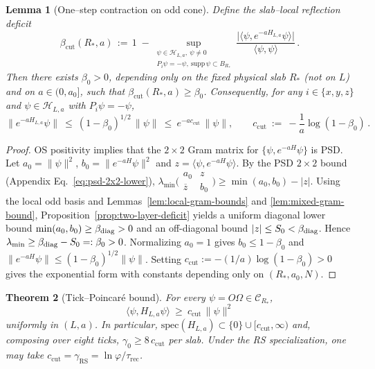 \documentclass[11pt]{amsart}
\theoremstyle{plain}
\newtheorem{theorem}{Theorem}[section]
\newtheorem{lemma}[theorem]{Lemma}
\theoremstyle{definition}
\theoremstyle{remark}
\begin{document}
\begin{lemma}[One--step contraction on odd cone]\label{lem:odd-contraction-tp}
Define the slab--local reflection deficit
\[
  \beta_{\mathrm{cut}}(R_*,a)
  \,:=\,
  1\;-
  \sup_{\substack{\psi\in\mathcal H_{L,a},\ \psi\ne 0\\ P_i\psi=-\psi,\ \mathrm{supp}\,\psi\subset B_{R_*}}}
  \frac{\big|\langle\psi, e^{-aH_{L,a}}\psi\rangle\big|}{\langle\psi,\psi\rangle}\,.
\]
Then there exists $\beta_0>0$, depending only on the fixed physical slab $R_*$ (not on $L$) and on $a\in(0,a_0]$, such that $\beta_{\mathrm{cut}}(R_*,a)\ge \beta_0$. Consequently, for any $i\in\{x,y,z\}$ and $\psi\in\mathcal{H}_{L,a}$ with $P_i\psi=-\psi$,
\[
  \|e^{-aH_{L,a}}\psi\|\ \le\ (1-\beta_0)^{1/2}\,\|\psi\|\ \le\ e^{-a c_{\mathrm{cut}}}\,\|\psi\|,
  \qquad c_{\mathrm{cut}}\ :=\ -\frac{1}{a}\log(1-\beta_0)\,.
\]
\end{lemma}
\begin{proof}
OS positivity implies that the $2\times 2$ Gram matrix for $\{\psi, e^{-aH}\psi\}$ is PSD. Let $a_0=\|\psi\|^2$, $b_0=\|e^{-aH}\psi\|^2$ and $z=\langle\psi, e^{-aH}\psi\rangle$. By the PSD $2\times 2$ bound (Appendix Eq.~\eqref{eq:psd-2x2-lower}), $\lambda_{\min}\bigl(\begin{smallmatrix} a_0 & z \\ \overline z & b_0 \end{smallmatrix}\bigr)\ge \min(a_0,b_0)-|z|$. Using the local odd basis and Lemmas~\ref{lem:local-gram-bounds} and \ref{lem:mixed-gram-bound}, Proposition~\ref{prop:two-layer-deficit} yields a uniform diagonal lower bound $\min(a_0,b_0)\ge \beta_{\rm diag}>0$ and an off-diagonal bound $|z|\le S_0<\beta_{\rm diag}$. Hence $\lambda_{\min}\ge \beta_{\rm diag}-S_0=:\beta_0>0$. Normalizing $a_0=1$ gives $b_0\le 1-\beta_0$ and $\|e^{-aH}\psi\|\le (1-\beta_0)^{1/2}\|\psi\|$. Setting $c_{\mathrm{cut}}:=-(1/a)\log(1-\beta_0)>0$ gives the exponential form with constants depending only on $(R_*,a_0,N)$.
\end{proof}

\begin{theorem}[Tick--Poincar\'e bound]\label{thm:tp-bound}
For every $\psi=O\Omega\in\mathcal{C}_{R_*}$,
\[
  \langle\psi,H_{L,a}\psi\rangle\ \ge\ c_{\mathrm{cut}}\,\|\psi\|^2
\]
uniformly in $(L,a)$. In particular, $\mathrm{spec}(H_{L,a})\subset\{0\}\cup[c_{\mathrm{cut}},\infty)$ and, composing over eight ticks, $\gamma_0\ge 8\,c_{\mathrm{cut}}$ per slab. Under the RS specialization, one may take $c_{\mathrm{cut}}=\gamma_{\mathrm{RS}}=\ln\varphi/\tau_{\mathrm{rec}}$.
\end{theorem}
\end{document}
